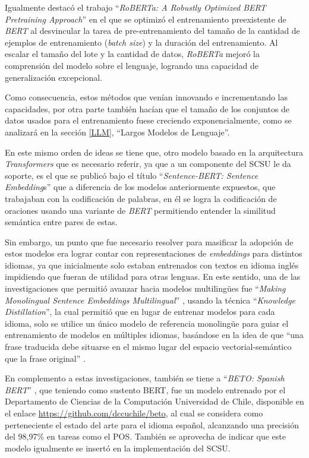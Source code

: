 \documentclass[
  12pt,
  openany]{book}
\begin{document}
Igualmente destacó el trabajo ``\emph{RoBERTa: A Robustly Optimized BERT Pretraining Approach}'' \citep{liu2019} en el que se optimizó el entrenamiento preexistente de \emph{BERT} al desvincular la tarea de pre-entrenamiento del tamaño de la cantidad de ejemplos de entrenamiento (\emph{batch size}) y la duración del entrenamiento. Al escalar el tamaño del lote y la cantidad de datos, \emph{RoBERTa} mejoró la comprensión del modelo sobre el lenguaje, logrando una capacidad de generalización excepcional.

Como consecuencia, estos métodos que venían innovando e incrementando las capacidades, por otra parte también hacían que el tamaño de los conjuntos de datos usados para el entrenamiento fuese creciendo exponencialmente, como se analizará en la sección \ref{LLM}, ``Largos Modelos de Lenguaje''.

En este mismo orden de ideas se tiene que, otro modelo basado en la arquitectura \emph{Transformers} que es necesario referir, ya que a un componente del SCSU le da soporte, es el que se publicó bajo el título ``\emph{Sentence-BERT: Sentence Embedding}s'' \citep{reimers2019a} que a diferencia de los modelos anteriormente expuestos, que trabajaban con la codificación de palabras, en él se logra la codificación de oraciones usando una variante de \emph{BERT} \citep{devlin2018} permitiendo entender la similitud semántica entre pares de estas.

Sin embargo, un punto que fue necesario resolver para masificar la adopción de estos modelos era lograr contar con representaciones de \emph{embeddings} para distintos idiomas, ya que inicialmente solo estaban entrenados con textos en idioma inglés impidiendo que fueran de utilidad para otras lenguas. En este sentido, una de las investigaciones que permitió avanzar hacia modelos multilingües fue ``\emph{Making Monolingual Sentence Embeddings Multilingual}'' \citep{reimers2020}, usando la técnica ``\emph{Knowledge Distillation}'', la cual permitió que en lugar de entrenar modelos para cada idioma, solo se utilice un único modelo de referencia monolingüe para guiar el entrenamiento de modelos en múltiples idiomas, basándose en la idea de que ``una frase traducida debe situarse en el mismo lugar del espacio vectorial-semántico que la frase original'' \citep{reimers2020}.

En complemento a estas investigaciones, también se tiene a ``\emph{BETO: Spanish BERT}'' \citep{CaneteCFP2020}, que teniendo como sustento BERT, fue un modelo entrenado por el Departamento de Ciencias de la Computación Universidad de Chile, disponible en el enlace \url{https://github.com/dccuchile/beto}, al cual se considera como perteneciente el estado del arte para el idioma español, alcanzando una precisión del 98,97\% en tareas como el POS. También se aprovecha de indicar que este modelo igualmente se insertó en la implementación del SCSU.
\end{document}
